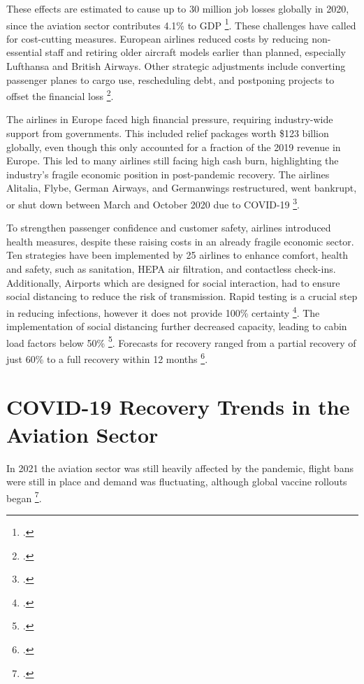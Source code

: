 \documentclass[12pt,onehalfspacing,headsepline,oneside,openright,a4paper, fleqn]{report}
\begin{document}
These effects are estimated to cause up to 30 million job losses globally in 2020, since the aviation sector contributes 4.1\% to GDP \footcite[6]{IACUS2020}. These challenges have called for cost-cutting measures. European airlines reduced costs by reducing non-essential staff and retiring older aircraft models earlier than planned, especially Lufthansa and British Airways. Other strategic adjustments include converting passenger planes to cargo use, rescheduling debt, and postponing projects to offset the financial loss \footcite[6-8,10]{dube2021b}.

The airlines in Europe faced high financial pressure, requiring industry-wide support from governments. This included relief packages worth \$123 billion globally, even though this only accounted for a fraction of the 2019 revenue in Europe. This led to many airlines still facing high cash burn, highlighting the industry's fragile economic position in post-pandemic recovery. The airlines Alitalia, Flybe, German Airways, and Germanwings restructured, went bankrupt, or shut down between March and October 2020 due to COVID-19 \footcite[8,10]{dube2021b}.

To strengthen passenger confidence and customer safety, airlines introduced health measures, despite these raising costs in an already fragile economic sector. Ten strategies have been implemented by 25 airlines to enhance comfort, health and safety, such as sanitation, HEPA air filtration, and contactless check-ins. Additionally, Airports which are designed for social interaction, had to ensure social distancing to reduce the risk of transmission. Rapid testing is a crucial step in reducing infections, however it does not provide 100\% certainty \footcite[9]{dube2021b}. The implementation of social distancing further decreased capacity, leading to cabin load factors below 50\% \footcite{suau2020}. Forecasts for recovery ranged from a partial recovery of just 60\% to a full recovery within 12 months \footcite[3]{IACUS2020}.


\section{COVID-19 Recovery Trends in the Aviation Sector}

In 2021 the aviation sector was still heavily affected by the pandemic, flight bans were still in place and demand was fluctuating, although global vaccine rollouts began \footcite[136]{sun2023}.
\end{document}
